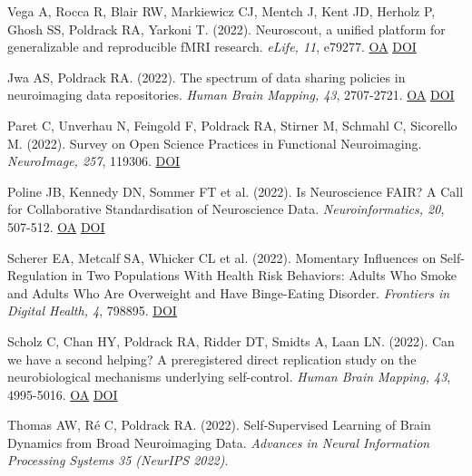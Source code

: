 \documentclass[10pt, letterpaper]{article}
\begin{document}
Vega A, Rocca R, Blair RW, Markiewicz CJ, Mentch J, Kent JD, Herholz P, Ghosh SS, Poldrack RA, Yarkoni T.  (2022). Neuroscout, a unified platform for generalizable and reproducible fMRI research. \textit{eLife, 11}, e79277. \href{https://www.ncbi.nlm.nih.gov/pmc/articles/PMC9489206}{OA} \href{https://doi.org/10.7554/elife.79277}{DOI} \vspace{2mm}

Jwa AS, Poldrack RA.  (2022). The spectrum of data sharing policies in neuroimaging data repositories. \textit{Human Brain Mapping, 43}, 2707-2721. \href{https://www.ncbi.nlm.nih.gov/pmc/articles/PMC9057092}{OA} \href{https://doi.org/10.1002/hbm.25803}{DOI} \vspace{2mm}

Paret C, Unverhau N, Feingold F, Poldrack RA, Stirner M, Schmahl C, Sicorello M.  (2022). Survey on Open Science Practices in Functional Neuroimaging. \textit{NeuroImage, 257}, 119306. \href{https://doi.org/10.1016/j.neuroimage.2022.119306}{DOI} \vspace{2mm}

Poline JB, Kennedy DN, Sommer FT et al. (2022). Is Neuroscience FAIR? A Call for Collaborative Standardisation of Neuroscience Data. \textit{Neuroinformatics, 20}, 507-512. \href{https://www.ncbi.nlm.nih.gov/pmc/articles/PMC9300762}{OA} \href{https://doi.org/10.1007/s12021-021-09557-0}{DOI} \vspace{2mm}

Scherer EA, Metcalf SA, Whicker CL et al. (2022). Momentary Influences on Self-Regulation in Two Populations With Health Risk Behaviors: Adults Who Smoke and Adults Who Are Overweight and Have Binge-Eating Disorder. \textit{Frontiers in Digital Health, 4}, 798895. \href{https://doi.org/10.3389/fdgth.2022.798895}{DOI} \vspace{2mm}

Scholz C, Chan HY, Poldrack RA, Ridder DT, Smidts A, Laan LN.  (2022). Can we have a second helping? A preregistered direct replication study on the neurobiological mechanisms underlying self-control. \textit{Human Brain Mapping, 43}, 4995-5016. \href{https://www.ncbi.nlm.nih.gov/pmc/articles/PMC9582371}{OA} \href{https://doi.org/10.1002/hbm.26065}{DOI} \vspace{2mm}

Thomas AW, Ré C, Poldrack RA.  (2022). Self-Supervised Learning of Brain Dynamics from Broad Neuroimaging Data. \textit{Advances in Neural Information Processing Systems 35 (NeurIPS 2022)}. \vspace{2mm}
\end{document}
